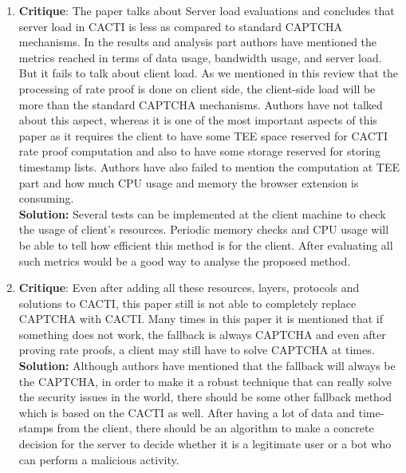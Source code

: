 \documentclass[runningheads,10pt]{llncs}
\begin{document}
	\begin{enumerate}

		\item\textbf{Critique}: The paper talks about Server load evaluations and concludes that server load in CACTI\cite{ourpaper} is less as compared to standard CAPTCHA mechanisms. In the results and analysis part authors have mentioned the metrics reached in terms of data usage, bandwidth usage, and server load. But it fails to talk about client load. As we mentioned in this review that the processing of rate proof is done on client side, the client-side load will be more than the standard CAPTCHA mechanisms. Authors have not talked about this aspect, whereas it is one of the most important aspects of this paper as it requires the client to have some TEE space reserved for CACTI\cite{ourpaper} rate proof computation and also to have some storage reserved for storing timestamp lists. Authors have also failed to mention the computation at TEE part and how much CPU usage and memory the browser extension is consuming.\\

		\textbf{Solution:} Several tests can be implemented at the client machine to check the usage of client's resources. Periodic memory checks and CPU usage will be able to tell how efficient this method is for the client. After evaluating all such metrics would be a good way to analyse the proposed method.\\

		\item \textbf{Critique}: Even after adding all these resources, layers, protocols and solutions to CACTI\cite{ourpaper}, this paper still is not able to completely replace CAPTCHA with CACTI. Many times in this paper it is mentioned that if something does not work, the fallback is always CAPTCHA and even after proving rate proofs, a client may still have to solve CAPTCHA at times.\\

		\textbf{Solution:} Although authors have mentioned that the fallback will always be the CAPTCHA, in order to make it a robust technique that can really solve the security issues in the world, there should be some other fallback method which is based on the CACTI\cite{ourpaper} as well. After having a lot of data and time-stamps from the client, there should be an algorithm to make a concrete decision for the server to decide whether it is a legitimate user or a bot who can perform a malicious activity.

	\end{enumerate}
\end{document}
